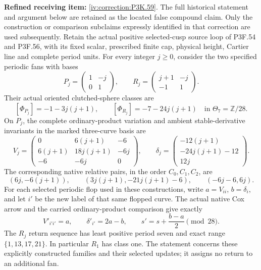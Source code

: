 \begin{theorem}\hypertarget{tag-02V5}{}\label{night:P3K.59}

\par\noindent\textbf{Refined receiving item:} \cref{iv:correction:P3K.59}. The full historical statement and argument below are retained as the located false compound claim. Only the construction or comparison subclaims expressly identified in that correction are used subsequently.
Retain the actual positive selected-cusp source loop of
P3F.54 and P3F.56, with its fixed scalar, prescribed finite cap,
physical height, Cartier line and complete period units. For every
integer \(j\geq0\), consider the two specified periodic fans with bases
\[
 P_j=\begin{pmatrix}1&-j\\0&1\end{pmatrix},\qquad
 R_j=\begin{pmatrix}j+1&-j\\-1&1\end{pmatrix}.
\]
Their actual oriented clutched-sphere classes are
\[
 [\Phi_{P_j}]=-1-3j(j+1),\qquad
 [\Phi_{R_j}]=-7-24j(j+1)\quad\text{in }\Theta_7=\mathbb Z/28.
\]
On \(P_j\), the complete ordinary-product variation and ambient
stable-derivative invariants in the marked three-curve basis are
\[
 V_j=\begin{pmatrix}
 0&6(j+1)&-6\\
 6(j+1)&18j(j+1)&-6j\\
 -6&-6j&0
 \end{pmatrix},\qquad
 \delta_j=\begin{pmatrix}-12(j+1)\\-24j(j+1)-12\\12j\end{pmatrix}.
\]
The corresponding native relative pairs, in the order \(C_0,C_1,C_2\), are
\[
 (6j,-6(j+1)),\qquad
 (3j(j+1),-21j(j+1)-6),\qquad
 (-6j-6,6j).
\]
For each selected periodic flop used in these constructions, write
\(a=V_{ii}\), \(b=\delta_i\), and let \(i'\) be the new label of that
same flopped curve. The actual native Cox arrow and the carried
ordinary-product comparison give exactly
\[
 V'_{i'i'}=a,\qquad \delta'_{i'}=2a-b,\qquad
 s'=s+\frac{b-a}{2}\pmod {28}.
\]
The \(R_j\) return sequence has least positive period seven and exact
range \(\{1,13,17,21\}\). In particular \(R_1\) has class one.
The statement concerns these explicitly constructed families and their
selected updates; it assigns no return to an additional fan.
\end{theorem}


